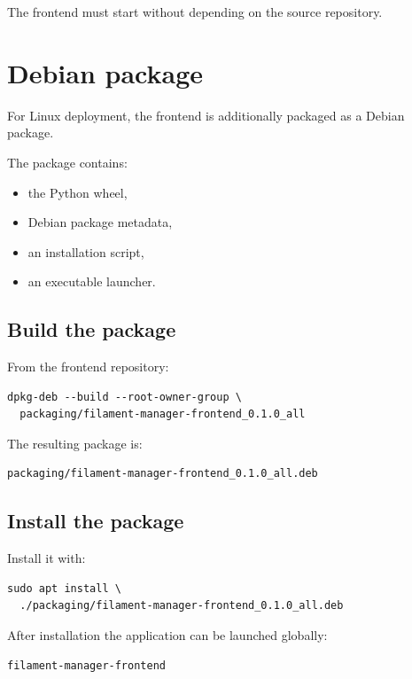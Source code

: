 \documentclass[a4paper,11pt]{article}
\begin{document}
The frontend must start without depending on the source repository.

\section{Debian package}

For Linux deployment, the frontend is additionally packaged as a Debian
package.

The package contains:

\begin{itemize}
  \item the Python wheel,
  \item Debian package metadata,
  \item an installation script,
  \item an executable launcher.
\end{itemize}

\subsection{Build the package}

From the frontend repository:

\begin{lstlisting}
dpkg-deb --build --root-owner-group \
  packaging/filament-manager-frontend_0.1.0_all
\end{lstlisting}

The resulting package is:

\begin{lstlisting}
packaging/filament-manager-frontend_0.1.0_all.deb
\end{lstlisting}

\subsection{Install the package}

Install it with:

\begin{lstlisting}
sudo apt install \
  ./packaging/filament-manager-frontend_0.1.0_all.deb
\end{lstlisting}

After installation the application can be launched globally:

\begin{lstlisting}
filament-manager-frontend
\end{lstlisting}
\end{document}
